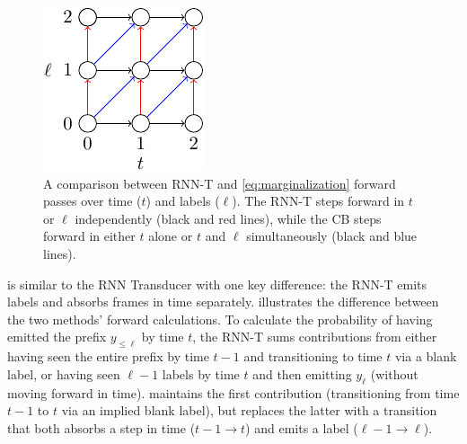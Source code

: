 \documentclass{article}
\begin{document}
\begin{figure}
    \centering
    \includegraphics[width=.5\textwidth]{rnnt_vs_cb.pdf}
    \caption{
        A comparison between RNN-T and \cref{eq:marginalization} forward passes
        over time ($t$) and labels ($\ell$). The RNN-T steps forward in $t$ or
        $\ell$ independently (black and red lines), while the CB steps forward
        in either $t$ alone or $t$ and $\ell$ simultaneously (black and blue
        lines).
    } \label{fig:rnnt_vs_cb}
\end{figure}

 is similar to the RNN Transducer
\cite{gravesSequenceTransductionRecurrent2012} with one key difference: the
RNN-T emits labels and absorbs frames in time separately. 
illustrates the difference between the two methods' forward calculations. To
calculate the probability of having emitted the prefix $y_{\leq \ell}$ by time
$t$, the RNN-T sums contributions from either having seen the entire prefix by
time $t - 1$ and transitioning to time $t$ via a blank label, or having seen
$\ell - 1$ labels by time $t$ and then emitting $y_\ell$ (without moving
forward in time).  maintains the first contribution
(transitioning from time $t-1$ to $t$ via an implied blank label), but replaces
the latter with a transition that both absorbs a step in time ($t - 1 \to t$)
and emits a label ($\ell - 1 \to \ell$).
\end{document}
